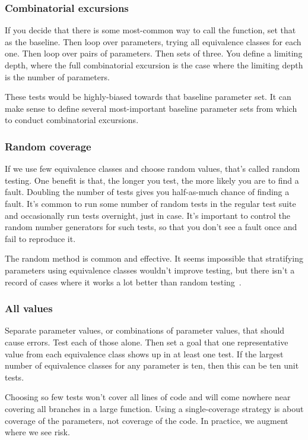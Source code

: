\documentclass[fleqn,10pt]{olplainarticle}
\begin{document}
\subsubsection{Combinatorial excursions}
If you decide that there is some most-common way to call
the function, set that as the baseline. Then loop over parameters,
trying all equivalence classes for each one. Then loop over pairs of parameters. Then sets of three. You define a limiting depth,
where the full combinatorial excursion is the case where the
limiting depth is the number of parameters.

These tests would be highly-biased towards that baseline parameter set.
It can make sense to define several most-important baseline
parameter sets from which to conduct combinatorial excursions.


\subsubsection{Random coverage}

If we use few equivalence classes and choose
random values, that's called random testing. One benefit is
that, the longer you test, the more likely you are to find
a fault. Doubling the number of tests gives you half-as-much
chance of finding a fault. It's common to run some number
of random tests in the regular test suite and occasionally
run tests overnight, just in case. It's important to control
the random number generators for such tests, so that you don't
see a fault once and fail to reproduce it.

The random method is common and effective. It seems impossible
that stratifying parameters using equivalence classes wouldn't
improve testing, but there isn't a record of cases where
it works a lot better than random testing~\citep{arcuri2011random}.


\subsubsection{All values}

Separate parameter values, or combinations of parameter values,
that should cause errors. Test each of those alone.
Then set a goal that one representative value from each
equivalence class shows up in at least one test.
If the largest number of equivalence classes for any parameter
is ten, then this can be ten unit tests.

Choosing so few tests won't cover all lines of code
and will come nowhere near covering all branches in a
large function. Using a single-coverage strategy is about
coverage of the parameters, not coverage of the code.
In practice, we augment where we see risk.
\end{document}

